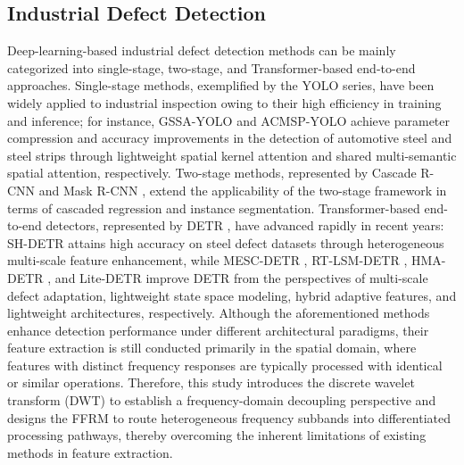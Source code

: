 \documentclass[pdflatex,sn-nature]{sn-jnl}
\begin{document}
\subsection{Industrial Defect Detection}
Deep-learning-based industrial defect detection methods can be mainly categorized into single-stage, two-stage, and Transformer-based end-to-end approaches. Single-stage methods, exemplified by the YOLO series, have been widely applied to industrial inspection owing to their high efficiency in training and inference; for instance, GSSA-YOLO \cite{Liu2026GSSAYOLO} and ACMSP-YOLO \cite{Zheng2026ACMSPYOLO} achieve parameter compression and accuracy improvements in the detection of automotive steel and steel strips through lightweight spatial kernel attention and shared multi-semantic spatial attention, respectively. Two-stage methods, represented by Cascade R-CNN \cite{Cai2018CascadeRCNN} and Mask R-CNN \cite{He2017MaskRCNN}, extend the applicability of the two-stage framework in terms of cascaded regression and instance segmentation. Transformer-based end-to-end detectors, represented by DETR \cite{Carion2020DETR}, have advanced rapidly in recent years: SH-DETR \cite{Wu2025SHDETR} attains high accuracy on steel defect datasets through heterogeneous multi-scale feature enhancement, while MESC-DETR \cite{Zhou2025MESCDETR}, RT-LSM-DETR \cite{Hsiang2025RTLSMDETR}, HMA-DETR \cite{Yu2026HMADETR}, and Lite-DETR \cite{Luo2025LiteDETR} improve DETR from the perspectives of multi-scale defect adaptation, lightweight state space modeling, hybrid adaptive features, and lightweight architectures, respectively. Although the aforementioned methods enhance detection performance under different architectural paradigms, their feature extraction is still conducted primarily in the spatial domain, where features with distinct frequency responses are typically processed with identical or similar operations. Therefore, this study introduces the discrete wavelet transform (DWT) to establish a frequency-domain decoupling perspective and designs the FFRM to route heterogeneous frequency subbands into differentiated processing pathways, thereby overcoming the inherent limitations of existing methods in feature extraction.
\end{document}
